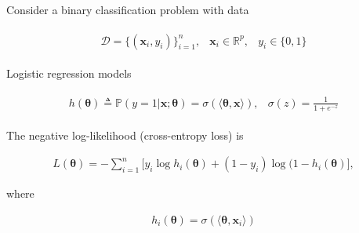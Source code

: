 \documentclass[11pt]{article}
\begin{document}
    Consider a binary classification problem with data 

    \begin{align*}
        \begin{matrix}
            \mathcal{D} = \{(\mathbf{x}_i, y_i)\}_{i = 1}^n, 
            & \mathbf{x}_i \in \mathbb{R}^p, 
            & y_i \in \{0, 1\}
        \end{matrix}
    \end{align*}

    Logistic regression models 

    \begin{align*}
        \begin{matrix}
            h(\boldsymbol{\theta}) \triangleq \mathbb{P}(y = 1 | \mathbf{x}; \boldsymbol{\theta}) =
            \sigma(\langle \boldsymbol{\theta}, \mathbf{x}\rangle),
            & \sigma(z) = \frac{1}{1 + e^{-z}}
        \end{matrix}
    \end{align*}

    The negative log-likelihood (cross-entropy loss) is 

    \begin{align*}
        L(\boldsymbol{\theta}) = -\sum_{i = 1}^n \Bigg[y_i \log h_i(\boldsymbol{\theta}) + (1 -
        y_i)\log(1 - h_i(\boldsymbol{\theta})\Bigg],
    \end{align*}

    where 

    \begin{align*}
        h_i(\boldsymbol{\theta}) = \sigma(\langle \boldsymbol{\theta}, \mathbf{x}_i \rangle)
    \end{align*}
\end{document}
